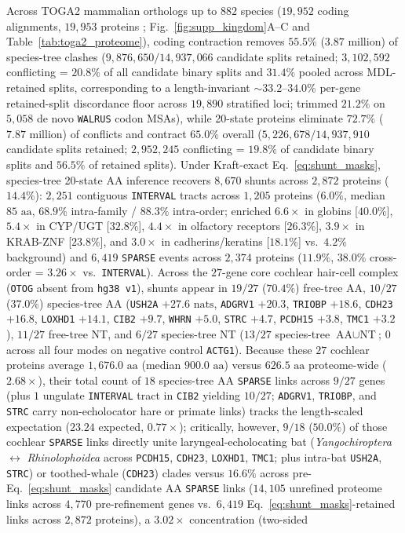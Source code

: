 \documentclass[12pt]{article}
\begin{document}
Across TOGA2 mammalian orthologs up to $882$ species ($19,952$ coding alignments, $19,953$ proteins \cite{kirilenko2023integrating,malovichko2026toga2}; Fig.~\ref{fig:supp_kingdom}A--C and Table~\ref{tab:toga2_proteome}), coding contraction removes $55.5\%$ ($3.87\text{ million}$) of species-tree clashes ($9,876,650 / 14,937,066$ candidate splits retained; $3,102,592$ conflicting = $20.8\%$ of all candidate binary splits and $31.4\%$ pooled across MDL-retained splits, corresponding to a length-invariant $\sim 33.2\text{--}34.0\%$ per-gene retained-split discordance floor across $19,890$ stratified loci; trimmed $21.2\%$ on $5,058$ de novo \texttt{WALRUS} codon MSAs), while 20-state proteins eliminate $72.7\%$ ($7.87\text{ million}$) of conflicts and contract $65.0\%$ overall ($5,226,678 / 14,937,910$ candidate splits retained; $2,952,245$ conflicting = $19.8\%$ of candidate binary splits and $56.5\%$ of retained splits). Under Kraft-exact Eq.~\eqref{eq:shunt_masks}, species-tree 20-state AA inference recovers $8,670$ shunts across $2,872$ proteins ($14.4\%$): $2,251$ contiguous \texttt{INTERVAL} tracts across $1,205$ proteins ($6.0\%$, median $85\text{ aa}$, $68.9\%$ intra-family / $88.3\%$ intra-order; enriched $6.6\times$ in globins [$40.0\%$], $5.4\times$ in CYP/UGT [$32.8\%$], $4.4\times$ in olfactory receptors [$26.3\%$], $3.9\times$ in KRAB-ZNF [$23.8\%$], and $3.0\times$ in cadherins/keratins [$18.1\%$] vs.\ $4.2\%$ background) and $6,419$ \texttt{SPARSE} events across $2,374$ proteins ($11.9\%$, $38.0\%$ cross-order = $3.26\times$ vs.\ \texttt{INTERVAL}). Across the $27$-gene core cochlear hair-cell complex \cite{davies2012molecular,shen2012parallel} (\texttt{OTOG} absent from \texttt{hg38 v1}), shunts appear in $19/27$ ($70.4\%$) free-tree AA, $10/27$ ($37.0\%$) species-tree AA (\texttt{USH2A} $+27.6\text{ nats}$, \texttt{ADGRV1} $+20.3$, \texttt{TRIOBP} $+18.6$, \texttt{CDH23} $+16.8$, \texttt{LOXHD1} $+14.1$, \texttt{CIB2} $+9.7$, \texttt{WHRN} $+5.0$, \texttt{STRC} $+4.7$, \texttt{PCDH15} $+3.8$, \texttt{TMC1} $+3.2$), $11/27$ free-tree NT, and $6/27$ species-tree NT ($13/27$ species-tree $\text{AA}\cup\text{NT}$; $0$ across all four modes on negative control \texttt{ACTG1}). Because these $27$ cochlear proteins average $1,676.0\text{ aa}$ (median $900.0\text{ aa}$) versus $626.5\text{ aa}$ proteome-wide ($2.68\times$), their total count of $18$ species-tree AA \texttt{SPARSE} links across $9/27$ genes (plus $1$ ungulate \texttt{INTERVAL} tract in \texttt{CIB2} yielding $10/27$; \texttt{ADGRV1}, \texttt{TRIOBP}, and \texttt{STRC} carry non-echolocator hare or primate links) tracks the length-scaled expectation ($23.24$ expected, $0.77\times$); critically, however, $9/18$ ($50.0\%$) of those cochlear \texttt{SPARSE} links directly unite laryngeal-echolocating bat (\textit{Yangochiroptera} $\leftrightarrow$ \textit{Rhinolophoidea} across \texttt{PCDH15}, \texttt{CDH23}, \texttt{LOXHD1}, \texttt{TMC1}; plus intra-bat \texttt{USH2A}, \texttt{STRC}) or toothed-whale (\texttt{CDH23}) clades versus $16.6\%$ across pre-Eq.~\eqref{eq:shunt_masks} candidate AA \texttt{SPARSE} links ($14,105$ unrefined proteome links across $4,770$ pre-refinement genes vs.\ $6,419$ Eq.~\eqref{eq:shunt_masks}-retained links across $2,872$ proteins), a $3.02\times$ concentration (two-sided 
\end{document}
